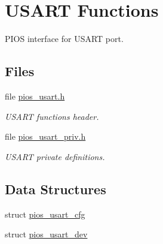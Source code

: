 \hypertarget{group___p_i_o_s___u_s_a_r_t}{\section{U\-S\-A\-R\-T Functions}
\label{group___p_i_o_s___u_s_a_r_t}
}


P\-I\-O\-S interface for U\-S\-A\-R\-T port.  


\subsection*{Files}
\begin{DoxyCompactItemize}
\item 
file \hyperlink{pios__usart_8h}{pios\-\_\-usart.\-h}
\begin{DoxyCompactList}\small\item\em U\-S\-A\-R\-T functions header. \end{DoxyCompactList}\item 
file \hyperlink{pios__usart__priv_8h}{pios\-\_\-usart\-\_\-priv.\-h}
\begin{DoxyCompactList}\small\item\em U\-S\-A\-R\-T private definitions. \end{DoxyCompactList}\end{DoxyCompactItemize}
\subsection*{Data Structures}
\begin{DoxyCompactItemize}
\item 
struct \hyperlink{structpios__usart__cfg}{pios\-\_\-usart\-\_\-cfg}
\item 
struct \hyperlink{structpios__usart__dev}{pios\-\_\-usart\-\_\-dev}
\end{DoxyCompactItemize}

